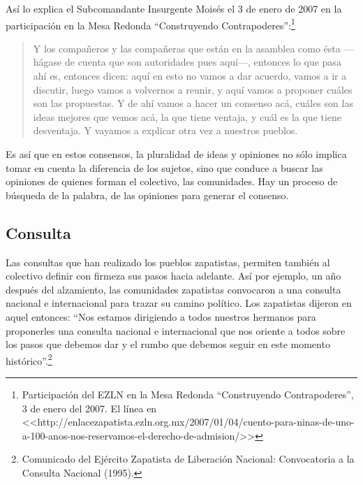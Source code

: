 \documentclass[oneside]{book}
\begin{document}
Así lo explica el Subcomandante Insurgente Moisés el 3 de enero de 2007 en la participación en la Mesa Redonda “Construyendo Contrapoderes”:\footnote{Participación del EZLN en la Mesa Redonda “Construyendo Contrapoderes”, 3 de enero del 2007. El línea en <<http://enlacezapatista.ezln.org.mx/2007/01/04/cuento-para-ninas-de-uno-a-100-anos-nos-reservamos-el-derecho-de-admision/>>}
\begin{quote}
Y los compañeros y las compañeras que están en la asamblea como ésta —hágase de cuenta que son autoridades pues aquí—, entonces lo que pasa ahí es, entonces dicen: aquí en esto no vamos a dar acuerdo, vamos a ir a discutir, luego vamos a volvernos a reunir, y aquí vamos a proponer cuáles son las propuestas. Y de ahí vamos a hacer un consenso acá, cuáles son las ideas mejores que vemos acá, la que tiene ventaja, y cuál es la que tiene desventaja. Y vayamos a explicar otra vez a nuestros pueblos.
\end{quote}

Es así que en estos consensos, la pluralidad de ideas y opiniones no sólo implica tomar en cuenta la diferencia de los sujetos, sino que conduce a buscar las opiniones de quienes forman el colectivo, las comunidades. Hay un proceso de búsqueda de la palabra, de las opiniones para generar el consenso.

\subsection{Consulta}
	
Las consultas que han realizado los pueblos zapatistas, permiten también al colectivo definir con firmeza sus pasos hacia adelante. Así por ejemplo, un año después del alzamiento, las comunidades zapatistas convocaron a una consulta nacional e internacional para trazar su camino político. Los zapatistas dijeron en aquel entonces: “Nos estamos dirigiendo a todos nuestros hermanos para proponerles una consulta nacional e internacional que nos oriente a todos sobre los pasos que debemos dar y el rumbo que debemos seguir en este momento histórico”.\footnote{Comunicado del Ejército Zapatista de Liberación Nacional: Convocatoria a la Consulta Nacional (1995).}
\end{document}

